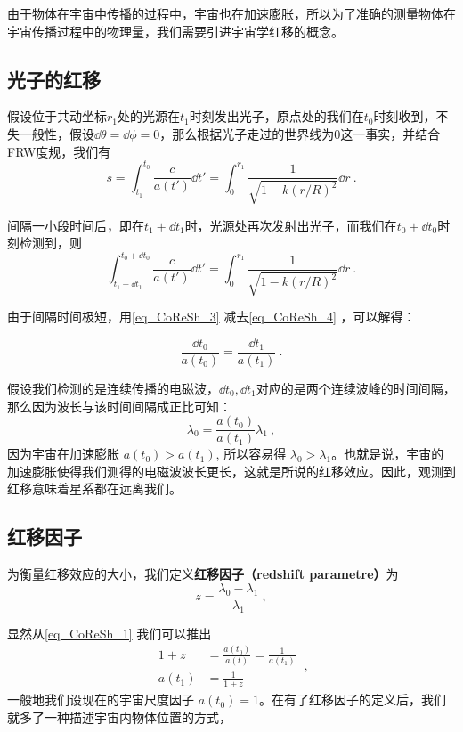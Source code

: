 
\begin{issues}
\issueMissDepend
\end{issues}

由于物体在宇宙中传播的过程中，宇宙也在加速膨胀，所以为了准确的测量物体在宇宙传播过程中的物理量，我们需要引进宇宙学红移的概念。

\subsection{光子的红移}
假设位于共动坐标$r_1$处的光源在$t_1$时刻发出光子，原点处的我们在$t_0$时刻收到，不失一般性，假设$\dd\theta=\dd\phi=0$，那么根据光子走过的世界线为$0$这一事实，并结合FRW度规，我们有
\begin{equation}\label{eq_CoReSh_4}
s=\int^{t_0}_{t_1}\frac{c}{a(t')}\dd t'=\int_0^{r_1}\frac{1}{\sqrt{1-k(r/R)^2}}\dd r~.
\end{equation}

间隔一小段时间后，即在$t_1+\dd t_1$时，光源处再次发射出光子，而我们在$t_0+\dd t_0$时刻检测到，则
\begin{equation}\label{eq_CoReSh_3}
\int^{t_0+\dd t_0}_{t_1+\dd t_1}\frac{c}{a(t')}\dd t'=\int_0^{r_1}\frac{1}{\sqrt{1-k(r/R)^2}}\dd r~.
\end{equation}

由于间隔时间极短，用\autoref{eq_CoReSh_3} 减去\autoref{eq_CoReSh_4} ，可以解得：

\begin{equation}
\frac{\dd t_0}{a(t_0)}=\frac{\dd t_1}{a(t_1)}~.
\end{equation}

假设我们检测的是连续传播的电磁波，$\dd t_0,\dd t_1$对应的是两个连续波峰的时间间隔，那么因为波长与该时间间隔成正比可知：
\begin{equation}\label{eq_CoReSh_1}
\lambda_0=\frac{a(t_0)}{a(t_1)}\lambda_1~,
\end{equation}
因为宇宙在加速膨胀 $a(t_0)>a(t_1)$, 所以容易得 $\lambda_0>\lambda_1$。也就是说，宇宙的加速膨胀使得我们测得的电磁波波长更长，这就是所说的红移效应。因此，观测到红移意味着星系都在远离我们。


\subsection{红移因子}
\begin{definition}{}
为衡量红移效应的大小，我们定义\textbf{红移因子（redshift parametre）}为
\begin{equation}
z=\frac{\lambda_0-\lambda_1}{\lambda_1}~,
\end{equation}
\end{definition}
显然从\autoref{eq_CoReSh_1} 我们可以推出
\begin{equation}
\begin{aligned}
1+z&=\frac{a(t_0)}{a(t)}=\frac{1}{a(t_1)}\\
a(t_1)&=\frac{1}{1+z}
\end{aligned}~,
\end{equation}
一般地我们设现在的宇宙尺度因子 $a(t_0)=1$。在有了红移因子的定义后，我们就多了一种描述宇宙内物体位置的方式，

